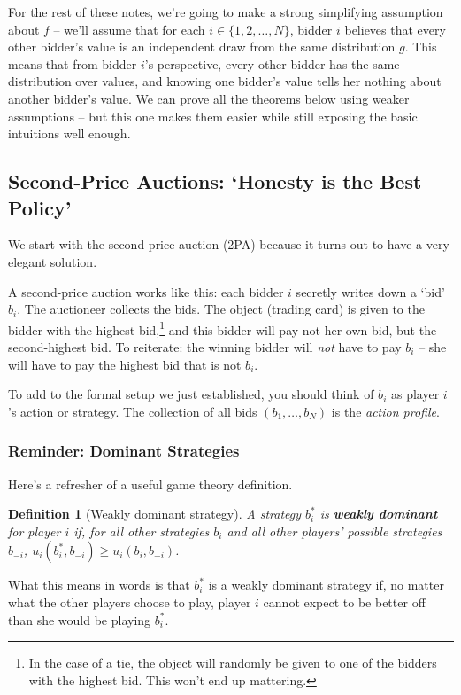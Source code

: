 \documentclass[12pt]{article}
\newtheorem{definition}[theorem]{Definition}
\theoremstyle{definition}
\theoremstyle{remark}
\theoremstyle{plain}                          %
\begin{document}
For the rest of these notes, we're going to make a strong simplifying assumption about $f$ -- we'll assume that for each $i \in \{1,2,\dots,N\}$, bidder $i$ believes that every other bidder's value is an independent draw from the same distribution $g$. This means that from bidder $i$'s perspective, every other bidder has the same distribution over values, and knowing one bidder's value tells her nothing about another bidder's value. We can prove all the theorems below using weaker assumptions -- but this one makes them easier while still exposing the basic intuitions well enough.

\subsection{Second-Price Auctions: `Honesty is the Best Policy'}\label{sec:second}

We start with the second-price auction (2PA) because it turns out to have a very elegant solution.

A second-price auction works like this: each bidder $i$ secretly writes down a `bid' $b_i$. The auctioneer collects the bids. The object (trading card) is given to the bidder with the highest bid,\footnote{In the case of a tie, the object will randomly be given to one of the bidders with the highest bid. This won't end up mattering.} and this bidder will pay not her own bid, but the second-highest bid. To reiterate: the winning bidder will \textit{not} have to pay $b_i$ -- she will have to pay the highest bid that is not $b_i$.

To add to the formal setup we just established, you should think of $b_i$ as player $i$'s action or strategy. The collection of all bids $(b_1,\dots,b_N)$ is the \textit{action profile}.

\subsubsection{Reminder: Dominant Strategies}

Here's a refresher of a useful game theory definition.

\begin{definition}[Weakly dominant strategy]
A strategy $b_i^*$ is \textbf{weakly dominant} for player $i$ if, for all other strategies $b_i$ and all other players' possible strategies $b_{-i}$, $u_i(b_i^*, b_{-i}) \geq u_i(b_i,b_{-i})$.
\end{definition}

\noindent What this means in words is that $b_i^*$ is a weakly dominant strategy if, no matter what the other players choose to play, player $i$ cannot expect to be better off than she would be playing $b_i^*$.
\end{document}

